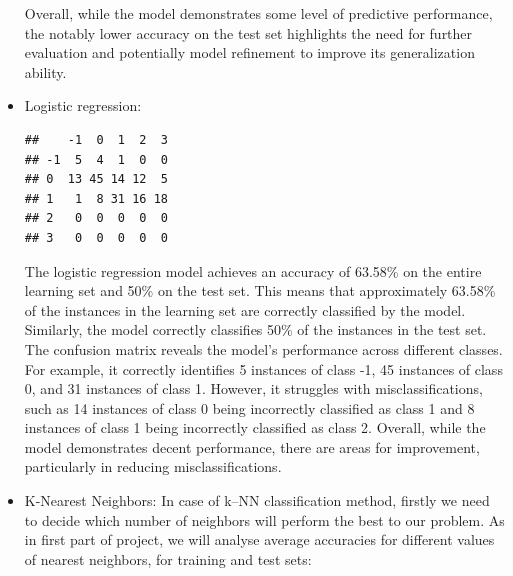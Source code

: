 \documentclass[11pt,a4paper]{article}\usepackage[]{graphicx}\usepackage[]{xcolor}
\makeatletter
\newenvironment{kframe}{%
 \def\at@end@of@kframe{}%
 \ifinner\ifhmode%
  \def\at@end@of@kframe{\end{minipage}}%
  \begin{minipage}{\columnwidth}%
 \fi\fi%
 \def\FrameCommand##1{\hskip\@totalleftmargin \hskip-\fboxsep
 \colorbox{shadecolor}{##1}\hskip-\fboxsep
     \hskip-\linewidth \hskip-\@totalleftmargin \hskip\columnwidth}%
 \MakeFramed {\advance\hsize-\width
   \@totalleftmargin\z@ \linewidth\hsize
   \@setminipage}}%
 {\par\unskip\endMakeFramed%
 \at@end@of@kframe}
\newenvironment{knitrout}{}{} %
\makeatother
\begin{document}
\begin{itemize}
Overall, while the model demonstrates some level of predictive performance, the notably lower accuracy on the test set highlights the need for further evaluation and potentially model refinement to improve its generalization ability. 
	 	
	 	\item Logistic regression:
\begin{knitrout}
\color{fgcolor}\begin{kframe}
\begin{verbatim}
##    -1  0  1  2  3
## -1  5  4  1  0  0
## 0  13 45 14 12  5
## 1   1  8 31 16 18
## 2   0  0  0  0  0
## 3   0  0  0  0  0
\end{verbatim}
\end{kframe}
\end{knitrout}

	 	The logistic regression model achieves an accuracy of 63.58\% on the entire learning set and 50\% on the test set. This means that approximately 63.58\% of the instances in the learning set are correctly classified by the model. Similarly, the model correctly classifies 50\% of the instances in the test set. The confusion matrix reveals the model's performance across different classes. For example, it correctly identifies 5 instances of class -1, 45 instances of class 0, and 31 instances of class 1. However, it struggles with misclassifications, such as 14 instances of class 0 being incorrectly classified as class 1 and 8 instances of class 1 being incorrectly classified as class 2. Overall, while the model demonstrates decent performance, there are areas for improvement, particularly in reducing misclassifications.
	 	
	 	\item K-Nearest Neighbors:
	 	In case of k--NN classification method, firstly we need to decide which number of neighbors will perform the best to our problem. As in first part of project, we will analyse average accuracies for different values of nearest neighbors, for training and test sets:
	 	

\end{itemize}
\end{document}
